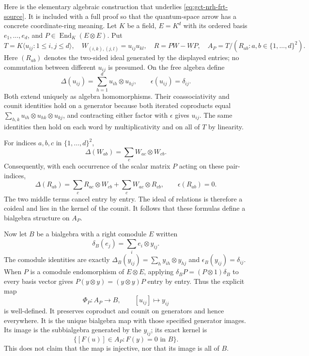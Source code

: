 Here is the elementary algebraic construction that underlies
\eqref{eq:gct-nrh-frt-source}.  It is included with a full proof so that
the quantum-space arrow has a concrete coordinate-ring meaning.
Let $K$ be a field, $E=K^d$ with its ordered basis $e_1,\ldots,e_d$, and
$P\in\operatorname{End}_K(E\otimes E)$.  Put
\[
 T=K\langle u_{ij}:1\le i,j\le d\rangle,
 \quad W_{(i,k),(j,l)}=u_{ij}u_{kl},
 \quad R=PW-WP,
 \quad A_P=T/(R_{ab}:a,b\in\{1,\ldots,d\}^2).
\]
Here $(R_{ab})$ denotes the two-sided ideal generated by the displayed
entries; no commutation between different $u_{ij}$ is presumed.
On the free algebra define
\[
 \Delta(u_{ij})=\sum_{h=1}^{d}u_{ih}\otimes u_{hj},
 \qquad \epsilon(u_{ij})=\delta_{ij}.
\]
Both extend uniquely as algebra homomorphisms.  Their coassociativity
and counit identities hold on a generator because both iterated
coproducts equal
$\sum_{h,k}u_{ih}\otimes u_{hk}\otimes u_{kj}$, and contracting either
factor with $\epsilon$ gives $u_{ij}$.  The same identities then hold on
each word by multiplicativity and on all of $T$ by linearity.

For indices $a,b,c$ in $\{1,\ldots,d\}^2$,
\[
 \Delta(W_{ab})=\sum_c W_{ac}\otimes W_{cb}.
\]
Consequently, with each occurrence of the scalar matrix $P$ acting on
these pair-indices,
\[
 \Delta(R_{ab})
 =\sum_c R_{ac}\otimes W_{cb}
       +\sum_c W_{ac}\otimes R_{cb},
 \qquad \epsilon(R_{ab})=0.
\]
The two middle terms cancel entry by entry.  The ideal of relations is
therefore a coideal and lies in the kernel of the counit.  It follows
that these formulas define a bialgebra structure on $A_P$.

Now let $B$ be a bialgebra with a right comodule $E$ written
\[
 \delta_B(e_j)=\sum_i e_i\otimes y_{ij}.
\]
The comodule identities are exactly
$\Delta_B(y_{ij})=\sum_h y_{ih}\otimes y_{hj}$ and
$\epsilon_B(y_{ij})=\delta_{ij}$.  When $P$ is a comodule endomorphism
of $E\otimes E$, applying $\delta_B P=(P\otimes1)\delta_B$ to every
basis vector gives
$P(y\otimes y)=(y\otimes y)P$ entry by entry.  Thus the explicit map
\begin{equation}\label{eq:gct-nrh-universal-map}
 \Phi_P:A_P\longrightarrow B,\qquad
       [u_{ij}]\longmapsto y_{ij}
\end{equation}
is well-defined.  It preserves coproduct and counit on generators and
hence everywhere.  It is the unique bialgebra map with those specified
generator images.  Its image is the subbialgebra generated by the
$y_{ij}$; its exact kernel is
\[
 \{[F(u)]\in A_P:F(y)=0\text{ in }B\}.
\]
This does not claim that the map is injective, nor that its image is all
of $B$.

